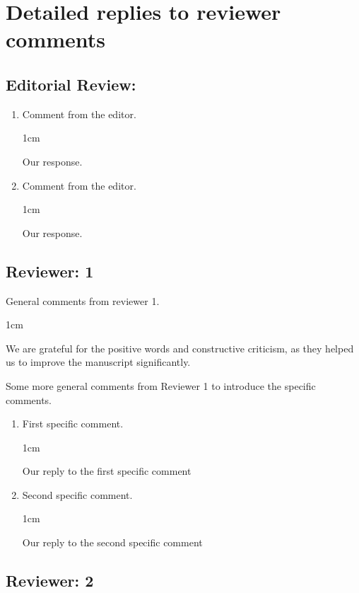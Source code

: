 \documentclass[11pt]{article}
\newenvironment{reply}{%
    \begin{adjustwidth}{1cm}{}
    \color{gray}%
}{%
    \end{adjustwidth}
}
\begin{document}
\section*{Detailed replies to reviewer comments}

\subsection*{Editorial Review:}

\begin{enumerate}
    \item
    Comment from the editor.
    \begin{reply}
        Our response.
    \end{reply}

    \item
    Comment from the editor.
    \begin{reply}
        Our response.
    \end{reply}
\end{enumerate}


\subsection*{Reviewer: 1}

General comments from reviewer 1.

\begin{reply}
    We are grateful for the positive words and constructive criticism, as they helped us to improve the manuscript significantly.
\end{reply}

Some more general comments from Reviewer 1 to introduce the specific comments.

\begin{enumerate}[parsep=0.5em]
    \item First specific comment.
    \begin{reply}
        Our reply to the first specific comment
    \end{reply}

    \item Second specific comment.
    \begin{reply}
        Our reply to the second specific comment
    \end{reply}
\end{enumerate}

\subsection*{Reviewer: 2}
\end{document}
